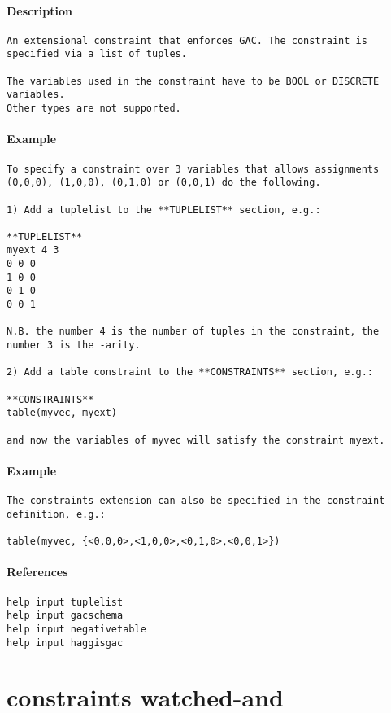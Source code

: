 \paragraph{Description}
{\footnotesize
\begin{verbatim}
An extensional constraint that enforces GAC. The constraint is
specified via a list of tuples.

The variables used in the constraint have to be BOOL or DISCRETE variables.
Other types are not supported.
\end{verbatim}
}
\paragraph{Example}
{\footnotesize
\begin{verbatim}
To specify a constraint over 3 variables that allows assignments
(0,0,0), (1,0,0), (0,1,0) or (0,0,1) do the following.

1) Add a tuplelist to the **TUPLELIST** section, e.g.:

**TUPLELIST**
myext 4 3
0 0 0
1 0 0
0 1 0
0 0 1

N.B. the number 4 is the number of tuples in the constraint, the
number 3 is the -arity.

2) Add a table constraint to the **CONSTRAINTS** section, e.g.:

**CONSTRAINTS**
table(myvec, myext)

and now the variables of myvec will satisfy the constraint myext.
\end{verbatim}
}
\paragraph{Example}
{\footnotesize
\begin{verbatim}
The constraints extension can also be specified in the constraint
definition, e.g.:

table(myvec, {<0,0,0>,<1,0,0>,<0,1,0>,<0,0,1>})
\end{verbatim}
}
\paragraph{References}
{\footnotesize
\begin{verbatim}
help input tuplelist
help input gacschema
help input negativetable
help input haggisgac
\end{verbatim}
}
\section{constraints watched-and}
